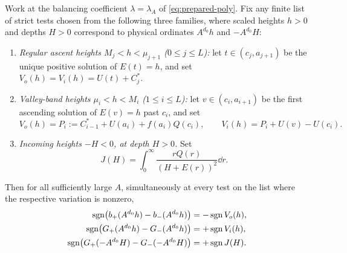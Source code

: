 \begin{lemma}\label{lem:valley-rates}
Work at the balancing coefficient $\lambda=\lambda_A$ of \eqref{eq:prepared-poly}. Fix any finite list
of strict tests chosen from the following three families, where scaled heights $h>0$ and depths $H>0$
correspond to physical ordinates $A^{d_0}h$ and $-A^{d_0}H$:
\begin{enumerate}
  \item[\textup{(i)}] \emph{Regular ascent heights $M_j<h<\mu_{j+1}$ ($0\le j\le L$):} let
  $t\in(c_j,a_{j+1})$ be the unique positive solution of $E(t)=h$, and set $V_o(h)=V_i(h)=U(t)+C_j^*$.
  \item[\textup{(ii)}] \emph{Valley-band heights $\mu_i<h<M_i$ ($1\le i\le L$):} let $v\in(c_i,a_{i+1})$
  be the first ascending solution of $E(v)=h$ past $c_i$, and set
  \begin{equation}\label{eq:Vo-Vi-band}
    V_o(h) = P_i := C_{i-1}^* + U(a_i) + f(a_i)Q(c_i), \qquad V_i(h) = P_i + U(v) - U(c_i).
  \end{equation}
  \item[\textup{(iii)}] \emph{Incoming heights $-H<0$, at depth $H>0$.} Set
  \begin{equation}\label{eq:J-def}
    J(H) = \int_0^\infty \frac{rQ(r)}{(H+E(r))^2}\dd r.
  \end{equation}
\end{enumerate}
Then for all sufficiently large $A$, simultaneously at every test on the list where the respective variation is nonzero,
\begin{align*}
  \operatorname{sgn}\bigl(b_+(A^{d_0}h) - b_-(A^{d_0}h)\bigr) &= -\operatorname{sgn} V_o(h), \\
  \operatorname{sgn}\bigl(G_+(A^{d_0}h) - G_-(A^{d_0}h)\bigr) &= +\operatorname{sgn} V_i(h), \\
  \operatorname{sgn}\bigl(G_+(-A^{d_0}H) - G_-(-A^{d_0}H)\bigr) &= +\operatorname{sgn} J(H).
\end{align*}
\end{lemma}

